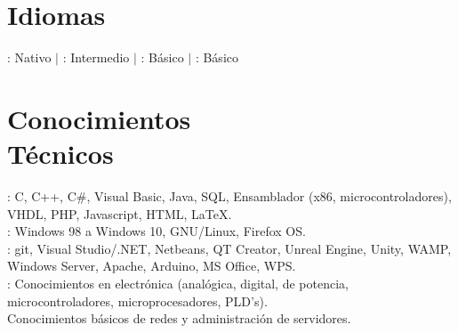 \documentclass[mm]{simple_style}
\begin{document}
\begin{resume}
\section{Idiomas}
: Nativo $|$ : Intermedio $|$ : B\'asico $|$ : B\'asico

\vspace{-2ex}
\sectionline

\section{Conocimientos\\T\'ecnicos}
: C, C++, C\#, Visual Basic, Java, SQL, Ensamblador (x86, microcontroladores), VHDL, PHP, Javascript, HTML, \LaTeX.
\\
: Windows 98 a Windows 10, GNU/Linux, Firefox OS.
\\
: git, Visual Studio/.NET, Netbeans, QT Creator, Unreal Engine, Unity, WAMP, Windows Server, Apache, Arduino, MS Office, WPS.
\\
: Conocimientos en electr\'onica (anal\'ogica, digital, de potencia, microcontroladores, microprocesadores, PLD's).
\\
Conocimientos b\'asicos de redes y administraci\'on de servidores.

\vspace{-2ex}
\sectionline


\end{resume}
\end{document}
